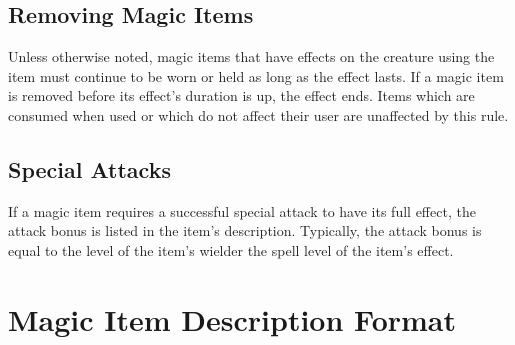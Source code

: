 \subsection{Removing Magic Items}
Unless otherwise noted, magic items that have effects on the creature using the item must continue to be worn or held as long as the effect lasts.
If a magic item is removed before its effect's duration is up, the effect ends.
Items which are consumed when used or which do not affect their user are unaffected by this rule.

\subsection{Special Attacks}

If a magic item requires a successful special attack to have its full effect, the attack bonus is listed in the item's description.
Typically, the attack bonus is equal to the level of the item's wielder \add the spell level of the item's effect.

\begin{comment}
\subsection{Charges, Doses, and Multiple Uses}

Many items, particularly wands and staffs, are limited in power by the number of charges they hold.
Normally, charged items have 50 charges at most.
If such an item is found as a random part of a treasure, roll d\% and divide by 2 to determine the number of charges left (round down, minimum 1).
If the item has a maximum number of charges other than 50, roll randomly to determine how many charges are left.

Prices listed are always for fully charged items.
(When an item is created, it is fully charged.) An item with no charges left is worth half the price of a fully charged item.
For an item that's worthless when its charges run out (which is the case for almost all charged items), the value of the partially used item is proportional to the number of charges left.
For an item that has usefulness in addition to its charges, only part of the item's value is based on the number of charges left.
\end{comment}

\section{Magic Item Description Format}

